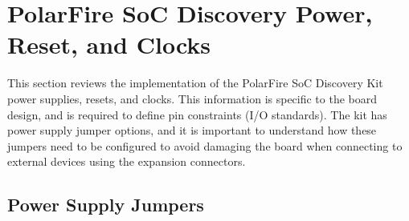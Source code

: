 \section{PolarFire SoC Discovery Power, Reset, and Clocks}
\label{sec:power}

This section reviews the implementation of the PolarFire SoC Discovery
Kit power supplies, resets, and clocks. This information is specific to
the board design, and is required to define pin constraints (I/O standards).
The kit has power supply jumper options, and it is important to understand
how these jumpers need to be configured to avoid damaging the board when
connecting to external devices using the expansion connectors.

\subsection{Power Supply Jumpers}

